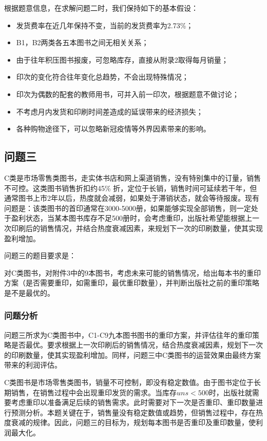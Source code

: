 \documentclass[bwprint]{gmcmthesis}
\begin{document}
根据题意信息，在求解问题二时，我们保持如下的基本假设：

\begin{itemize}
	\item 发货费率在近几年保持不变，当前的发货费率为2.73\%；
	\item B1，B2两类各五本图书之间无相关关系；
	\item 由于往年积压图书报废，可忽略库存，直接从附录2取得每月销量；
	\item 印次的变化符合往年变化总趋势，不会出现特殊情况；
	\item 印次为偶数的配套的教师用书，可并入前一印次，根据题意不做讨论；
	\item 不考虑月内发货和印刷时间差造成的延误带来的经济损失；
	\item 各种购物途径下，可以忽略新冠疫情等外界因素带来的影响。
\end{itemize}

\subsection{问题三}

C类是市场零售类图书，走实体书店和网上渠道销售，没有特别集中的订量，销售不可控。这类图书销售折扣约45\% 折，定位于长销，销售时间可延续若干年，但通常图书上市2年以后，热度就会减弱，如果处于滞销状态，就会等待报废。现有问题是：该类图书的首印通常在3000-5000册，如果能够实现全部销售，则一定处于盈利状态，当某本图书库存不足500册时，会考虑重印，出版社希望能根据上一次印刷后的销售情况，并结合热度衰减因素，来规划下一次的印刷数量，使其实现盈利增加。

问题三的题目要求是：

对C类图书，对附件3中的9本图书，考虑未来可能的销售情况，给出每本书的重印方案（是否需要重印，如需重印，最优重印数量），并判断出版社之前的重印策略是不是最优的。

\subsubsection{问题分析}

问题三所求为C类图书中，C1-C9九本图书图书的重印方案，并评估往年的重印策略是否最优。要求根据上一次印刷后的销售情况，结合热度衰减因素，规划下一次的印刷数量，使其实现盈利增加。同样，问题三中C类图书的运营效果由最终方案带来的利润评估。

C类图书是市场零售类图书，销量不可控制，即没有稳定数值。由于图书定位于长期销售，在销售过程中会出现重印发货的需求。当库存$uns<500$时，出版社就需要考虑重印以准备满足后续的销售需求。此时需要对下一次是否重印、重印数量进行预测分析。本题关键在于，销售量没有稳定数值或趋势，但销售过程中，存在热度衰减的规律。因此，问题三的目标为，规划每本图书是否重印及重印数量，使利润最大化。
\end{document}
